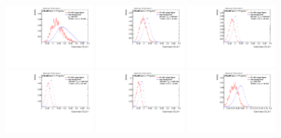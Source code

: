 \begin{figure}
\includegraphics[width=0.3\textwidth]{sascha_input/Appendix/Distributions/w/distributions/beta1/h_recoJet_C2_bin1.pdf} \hspace{1mm}
\includegraphics[width=0.3\textwidth]{sascha_input/Appendix/Distributions/w/distributions/beta1/h_recoJet_C2_bin2.pdf} \hspace{1mm}
\includegraphics[width=0.3\textwidth]{sascha_input/Appendix/Distributions/w/distributions/beta1/h_recoJet_C2_bin3.pdf} 
\bigskip
\includegraphics[width=0.3\textwidth]{sascha_input/Appendix/Distributions/w/distributions/beta1/h_recoJet_C2_bin4.pdf} \hspace{1mm}
\includegraphics[width=0.3\textwidth]{sascha_input/Appendix/Distributions/w/distributions/beta1/h_recoJet_C2_bin5.pdf} \hspace{1mm}
\includegraphics[width=0.3\textwidth]{sascha_input/Appendix/Distributions/w/distributions/beta1/h_recoJet_C2_bin6.pdf}

\end{figure}
